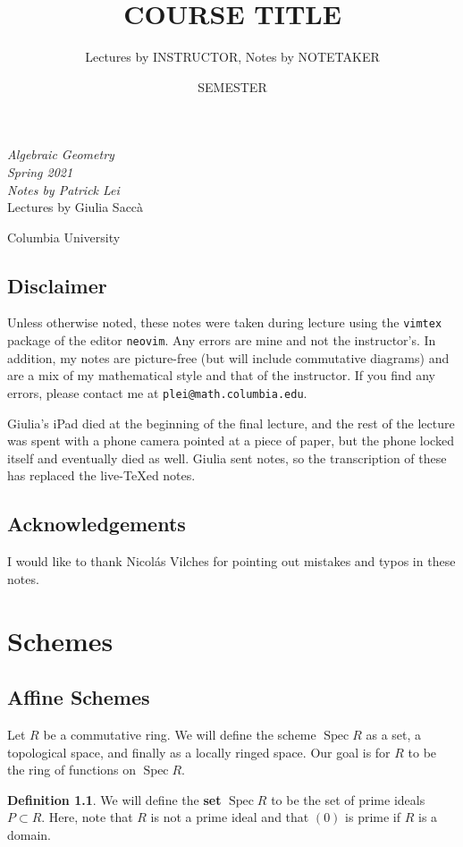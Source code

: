 \documentclass[leqno, openany]{memoir}
\title{COURSE TITLE}
\author{Lectures by INSTRUCTOR, Notes by NOTETAKER}
\date{SEMESTER}
\theoremstyle{definition}
\newtheorem{defn}[thm]{Definition}
\theoremstyle{remark}
\theoremstyle{plain}
\theoremstyle{definition}
\theoremstyle{remark}
\DeclareMathOperator{\Spec}{Spec}
\newcommand*{\titleSW}
    {\begingroup%
    \raggedleft
    \vspace*{\baselineskip}
    {\Huge\itshape Algebraic Geometry \\ Spring 2021}\\[\baselineskip]
    {\large\itshape Notes by Patrick Lei}\\[0.2\textheight]
    {\Large Lectures by Giulia Sacc\`a}\par
    \vfill
    {\Large \sffamily Columbia University}
    \vspace*{\baselineskip}
\endgroup}
\begin{document}
    
\begin{titlingpage}
\titleSW
\end{titlingpage}

\thispagestyle{empty}
\section*{Disclaimer}%
\label{sec:disclaimer}

Unless otherwise noted, these notes were taken during lecture using the \texttt{vimtex} package of the editor \texttt{neovim}. 
Any errors are mine and not the instructor's. 
In addition, my notes are picture-free (but will include commutative diagrams) and are a mix of my mathematical style and that of the instructor.
If you find any errors, please contact me at \texttt{plei@math.columbia.edu}.

Giulia's iPad died at the beginning of the final lecture, and the rest of the lecture was spent with a phone camera pointed at a piece of paper, but the phone locked itself and eventually died as well. Giulia sent notes, so the transcription of these has replaced the live-{\TeX}ed notes.

\section*{Acknowledgements}%
\label{sec:acknowledgements}

I would like to thank Nicol\'as Vilches for pointing out mistakes and typos in these notes.

\newpage

\tableofcontents

\chapter{Schemes}%
\label{cha:schemes}

\section{Affine Schemes}%
\label{sec:affine_schemes}

Let $R$ be a commutative ring. We will define the scheme $\Spec R$ as a set, a topological space, and finally as a locally ringed space. Our goal is for $R$ to be the ring of functions on $\Spec R$.

\begin{defn}
    We will define the \textbf{set} $\Spec R$ to be the set of prime ideals $P \subset R$. Here, note that $R$ is not a prime ideal and that $(0)$ is prime if $R$ is a domain. 
\end{defn}
\end{document}

